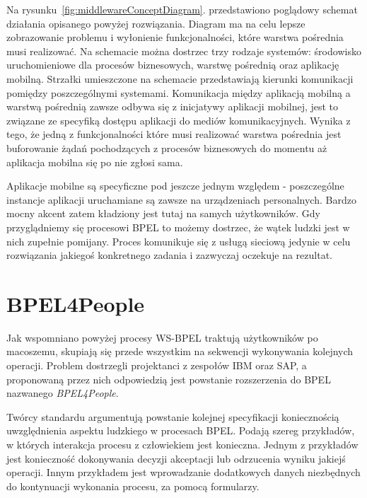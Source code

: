 Na rysunku~\ref{fig:middlewareConceptDiagram}. przedstawiono poglądowy schemat działania opisanego powyżej rozwiązania. Diagram ma na celu lepsze zobrazowanie problemu i wyłonienie funkcjonalności, które warstwa pośrednia musi realizować. Na schemacie można dostrzec trzy rodzaje systemów: środowisko uruchomieniowe dla procesów biznesowych, warstwę pośrednią oraz aplikację mobilną. Strzałki umieszczone na schemacie przedstawiają kierunki komunikacji pomiędzy poszczególnymi systemami.  Komunikacja między aplikacją mobilną a warstwą pośrednią zawsze odbywa się z inicjatywy aplikacji mobilnej, jest to związane ze specyfiką dostępu aplikacji do mediów komunikacyjnych. Wynika z tego, że jedną z funkcjonalności które musi  realizować warstwa pośrednia jest buforowanie żądań pochodzących z procesów biznesowych do momentu aż aplikacja mobilna się po nie zgłosi sama. 

Aplikacje mobilne są specyficzne pod jeszcze jednym względem - poszczególne instancje aplikacji uruchamiane są zawsze na urządzeniach personalnych. Bardzo mocny akcent zatem kładziony jest tutaj na samych użytkowników. Gdy przyglądniemy się procesowi BPEL to możemy dostrzec, że wątek ludzki jest w nich zupełnie pomijany. Proces komunikuje się z usługą sieciową jedynie w celu rozwiązania jakiegoś konkretnego zadania i zazwyczaj oczekuje na rezultat.


\section{BPEL4People}
\label{sec:BPEL4People}

Jak wspomniano powyżej procesy WS-BPEL traktują użytkowników po macoszemu, skupiają się przede wszystkim na sekwencji wykonywania kolejnych operacji. Problem dostrzegli projektanci z zespołów IBM oraz SAP, a proponowaną przez nich odpowiedzią jest powstanie rozszerzenia do BPEL nazwanego \textit{BPEL4People}.  

Twórcy standardu argumentują powstanie kolejnej specyfikacji koniecznością uwzględnienia aspektu ludzkiego w procesach BPEL. Podają szereg przykładów, w których interakcja procesu z człowiekiem jest konieczna. Jednym z przykładów jest konieczność dokonywania decyzji akceptacji lub odrzucenia wyniku jakiejś operacji. Innym przykładem jest wprowadzanie dodatkowych danych niezbędnych do kontynuacji wykonania procesu, za pomocą formularzy\cite[str. 4]{bpel4People}.

